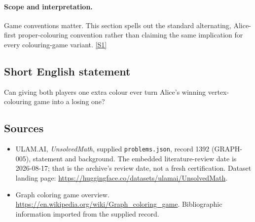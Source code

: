 \documentclass[11pt,a4paper]{article}
\newcommand{\sref}[2]{\hyperlink{source:#1:#2}{[S#2]}}
\begin{document}
\paragraph{Scope and interpretation.}

Game conventions matter. This section spells out the standard alternating, Alice-first proper-colouring convention rather than claiming the same implication for every colouring-game variant. \sref{1392}{1}

\subsection{Short English statement}

Can giving both players one extra colour ever turn Alice’s winning vertex-colouring game into a losing one?

\subsection{Sources}

{\small

\begin{itemize}

\item[\hypertarget{source:1392:1}{S1}] ULAM.AI, \emph{UnsolvedMath}, supplied \texttt{problems.json}, record 1392 (GRAPH-005), statement and background. The embedded literature-review date is 2026-08-17; that is the archive’s review date, not a fresh certification. Dataset landing page: \url{https://huggingface.co/datasets/ulamai/UnsolvedMath}.

\item[\hypertarget{source:1392:2}{S2}] Graph coloring game overview. \url{https://en.wikipedia.org/wiki/Graph_coloring_game}. Bibliographic information imported from the supplied record.

\end{itemize}

}

\label{end:1392}
\end{document}
